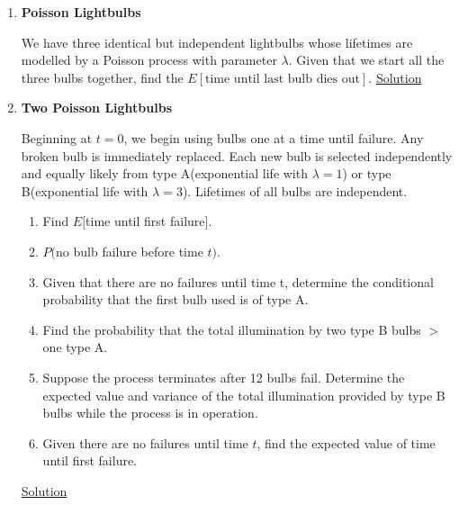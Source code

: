 \documentclass[11pt, a4paper]{article}
\begin{document}
\begin{enumerate}
    \item \hypertarget{q_poissonbulb}{\textbf{Poisson Lightbulbs}}\newline
    We have three identical but independent lightbulbs whose lifetimes are modelled by a Poisson process with parameter $\lambda$. Given that we start all the three bulbs together, find the $E[\text{time until last bulb dies out}]$. \hyperlink{a_poissonbulb}{Solution}


    \item \hypertarget{q_poissonbulb2}{\textbf{Two Poisson Lightbulbs}}\newline
    Beginning at $t=0$, we begin using bulbs one at a time until failure. Any broken bulb is immediately replaced. Each new bulb is selected independently and equally likely from type A(exponential life with $\lambda = 1$) or type B(exponential life with $\lambda = 3$). Lifetimes of all bulbs are independent.
    \begin{enumerate}
        \item Find $E[$time until first failure$]$.
        \item $P($no bulb failure before time $t)$.
        \item Given that there are no failures until time t, determine the conditional probability that the first bulb used is of type A.
        \item Find the probability that the total illumination by two type B bulbs $>$ one type A.
        \item Suppose the process terminates after 12 bulbs fail. Determine the expected value and variance of the total illumination provided by type B bulbs while the process is in operation.
        \item Given there are no failures until time $t$, find the expected value of time until first failure.
    \end{enumerate}
    \hyperlink{a_poissonbulb2}{Solution}


\end{enumerate}
\end{document}
